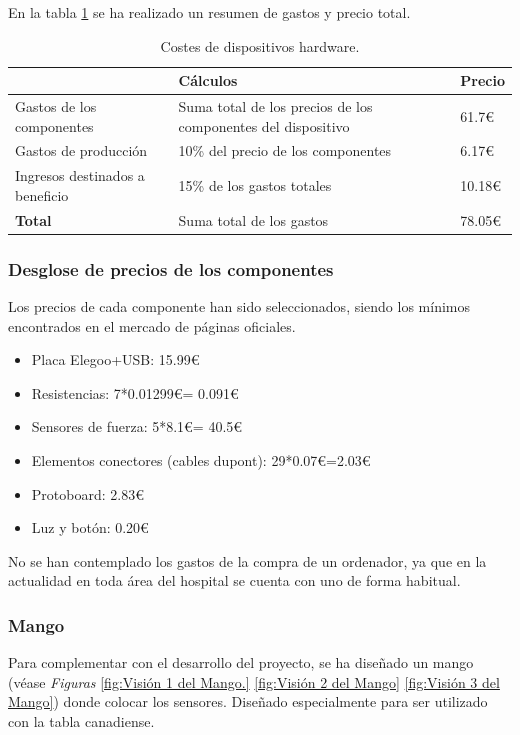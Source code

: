 En la tabla \ref{tab:costes_hardware} se ha realizado un resumen de gastos y precio total. 
\begin{table}[]
\centering
\begin{tabular}{|l|p{8cm}|l|}
\hline
\rowcolor[HTML]{BFBFBF} 
\textbf{} & \textbf{Cálculos} & \textbf{Precio} \\ \hline
Gastos de los componentes & Suma total de los precios de los componentes del dispositivo & 61.7€\\ \hline
Gastos de producción & 10\% del precio de los
 componentes & 6.17€\\ \hline
Ingresos destinados a beneficio & 15\% de los gastos totales & 10.18€\\ \hline
\textbf{Total}& Suma total de los gastos & 78.05€ \\ \hline
\end{tabular}
\caption{Costes de dispositivos hardware.}
\label{tab:costes_hardware}
\end{table}

\subsubsection{\textbf{Desglose de precios de los componentes}}
Los precios de cada componente han sido seleccionados, siendo los mínimos encontrados en el mercado de páginas oficiales.
\begin{itemize}
    \item Placa Elegoo+USB: 15.99€
    \item Resistencias: 7*0.01299€= 0.091€
    \item Sensores de fuerza: 5*8.1€= 40.5€
    \item Elementos conectores (cables dupont): 29*0.07€=2.03€
    \item Protoboard: 2.83€
    \item Luz y botón: 0.20€
\end{itemize}
No se han contemplado los gastos de la compra de un ordenador, ya que en la actualidad en toda área del hospital se cuenta con uno de forma habitual. 

\subsubsection{Mango}

Para complementar con el desarrollo del proyecto, se ha diseñado un mango (véase \textit{Figuras} \ref{fig:Visión 1 del Mango.} \ref{fig:Visión 2 del Mango} \ref{fig:Visión 3 del Mango}) donde colocar los sensores. Diseñado especialmente para ser utilizado con la tabla canadiense. 

